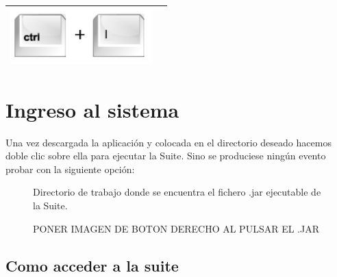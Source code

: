 \begin{table}[H]
\begin{center}
\begin{tabular}{|p{6cm}|p{8cm}|}
\hline
\includegraphics[width=5.5cm]{./imagenes_documentacion/key_ctrl_i.png} & \vspace*{-.8in}{Sobre Graphvisualx. Se abre una nueva ventana donde viene información sobre el autor de Graphvisualx y demás.} \\
\hline
\end{tabular}
\end{center}
\end{table}

\section{Ingreso al sistema}

Una vez descargada la aplicación y colocada en el directorio deseado hacemos doble clic sobre ella para ejecutar la Suite. Sino se produciese ningún evento probar con la siguiente opción:
\begin{figure}[H]
\caption{Directorio de trabajo donde se encuentra el fichero .jar ejecutable de la Suite.}
\end{figure}

\begin{figure}[H]
\caption{PONER IMAGEN DE BOTON DERECHO AL PULSAR EL .JAR}
\end{figure}


\subsection{Como acceder a la suite}
\label{cap:Acceder}

